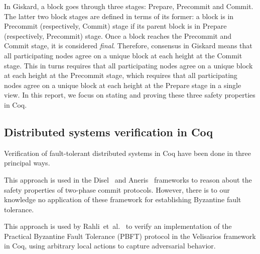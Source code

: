 \documentclass{easychair}
\begin{document}

In Giskard, a block goes through three stages: Prepare, Precommit and Commit. The latter two block stages are defined in terms of its former: a block is in Precommit (respectively, Commit) stage if its parent block is in Prepare (respectively, Precommit) stage. Once a block reaches the Precommit and Commit stage, it is considered \emph{final}. Therefore, consensus in Giskard means that all participating nodes agree on a unique block at each height at the Commit stage. This in turns requires that all participating nodes agree on a unique block at each height at the Precommit stage, which requires that all participating nodes agree on a unique block at each height at the Prepare stage in a single view. In this report, we focus on stating and proving these three safety properties in Coq.

\subsection{Distributed systems verification in Coq}
Verification of fault-tolerant distributed systems in Coq have been done in three principal ways.

 This approach is used in the Disel~\cite{Sergey2018} and Aneris~\cite{Krogh2020} frameworks to reason about the safety properties of two-phase commit protocols. However, there is to our knowledge no application of these framework for establishing Byzantine fault tolerance.

 This approach is used by Rahli~et~al.~\cite{Rahli2018} to verify an implementation of the Practical Byzantine Fault Tolerance (PBFT) protocol in the Velisarios framework in Coq, using arbitrary local actions to capture adversarial behavior.
\end{document}
